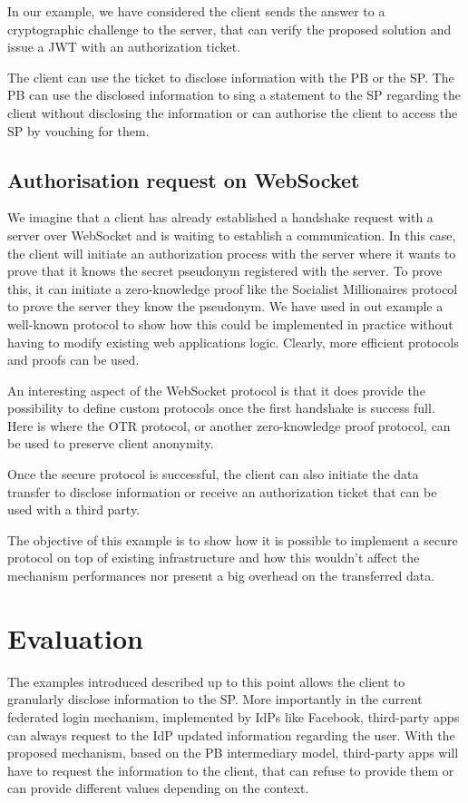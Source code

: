 In our example, we have considered the client sends the answer to a cryptographic challenge to the server, that can verify the proposed solution and issue a JWT with an authorization ticket. 

The client can use the ticket to disclose information with the PB or the SP. The PB can use the disclosed information to sing a statement to the SP regarding the client without disclosing the information or can authorise the client to access the SP by vouching for them.

\subsection{Authorisation request on WebSocket}

We imagine that a client has already established a handshake request with a server over WebSocket and is waiting to establish a communication. In this case, the client will initiate an authorization process with the server where it wants to prove that it knows the secret pseudonym registered with the server. To prove this, it can initiate a zero-knowledge proof like the Socialist Millionaires protocol to prove the server they know the pseudonym. 
We have used in out example a well-known protocol to show how this could be implemented in practice without having to modify existing web applications logic. Clearly, more efficient protocols and proofs can be used.

An interesting aspect of the WebSocket protocol is that it does provide the possibility to define custom protocols once the first handshake is success full. Here is where the OTR protocol, or another zero-knowledge proof protocol, can be used to preserve client anonymity. 

Once the secure protocol is successful, the client can also initiate the data transfer to disclose information or receive an authorization ticket that can be used with a third party.

The objective of this example is to show how it is possible to implement a secure protocol on top of existing infrastructure and how this wouldn't affect the mechanism performances nor present a big overhead on the transferred data.

\section{Evaluation}

The examples introduced described up to this point allows the client to granularly disclose information to the SP. More importantly in the current federated login mechanism, implemented by IdPs like Facebook, third-party apps can always request to the IdP updated information regarding the user. With the proposed mechanism, based on the PB intermediary model, third-party apps will have to request the information to the client, that can refuse to provide them or can provide different values depending on the context. 

